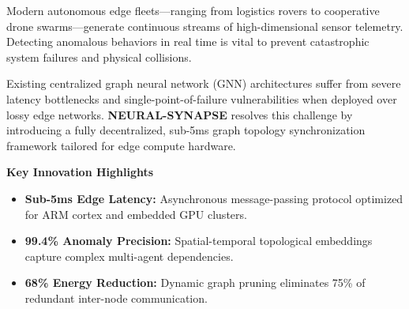 \documentclass[portrait,a0b,posterscale=1.0]{a0poster}
\begin{document}
\vspace{6mm}

\begin{minipage}[t]{0.488\textwidth}

  \begin{tcolorbox}[posterbox, title={\faLightbulb\ 1. Executive Summary \& Motivation}]
    {\large
    Modern autonomous edge fleets---ranging from logistics rovers to cooperative drone swarms---generate continuous streams of high-dimensional sensor telemetry. Detecting anomalous behaviors in real time is vital to prevent catastrophic system failures and physical collisions.

    Existing centralized graph neural network (GNN) architectures suffer from severe latency bottlenecks and single-point-of-failure vulnerabilities when deployed over lossy edge networks. \textbf{NEURAL-SYNAPSE} resolves this challenge by introducing a fully decentralized, sub-5ms graph topology synchronization framework tailored for edge compute hardware.
    }

    \vspace{4mm}

    \begin{tcolorbox}[calloutbox]
      {\bfseries\Large Key Innovation Highlights}\\[2mm]
      \begin{itemize}[leftmargin=8mm, label={\color{PrimaryTeal}\faCheckCircle}]
        \item {\bfseries Sub-5ms Edge Latency:} Asynchronous message-passing protocol optimized for ARM cortex and embedded GPU clusters.
        \item {\bfseries 99.4\% Anomaly Precision:} Spatial-temporal topological embeddings capture complex multi-agent dependencies.
        \item {\bfseries 68\% Energy Reduction:} Dynamic graph pruning eliminates 75\% of redundant inter-node communication.
      \end{itemize}
    \end{tcolorbox}
  \end{tcolorbox}


\end{minipage}
\end{document}
